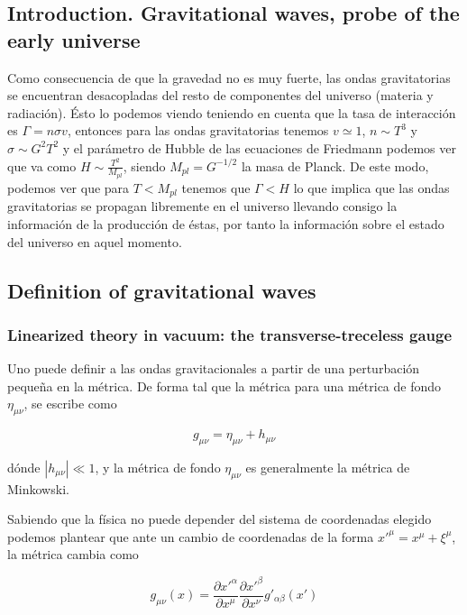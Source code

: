 \subsection{Introduction. Gravitational waves, probe of the early universe}

Como consecuencia de que la gravedad no es muy fuerte, las ondas gravitatorias se encuentran desacopladas del resto de componentes del universo (materia y radiación). Ésto lo podemos viendo teniendo en cuenta que la tasa de interacción es $\Gamma = n \sigma v$, entonces para las ondas gravitatorias tenemos $v \simeq 1$, $n \sim T^3$ y $\sigma \sim G^2 T^2$ y el parámetro de Hubble de las ecuaciones de Friedmann podemos ver que va como $\displaystyle H \sim \frac{T^2}{M_{pl}}$, siendo $M_{pl} = G^{-1/2}$ la masa de Planck. De este modo, podemos ver que para $T < M_{pl}$ tenemos que $\Gamma < H$ lo que implica que las ondas gravitatorias se propagan libremente en el universo llevando consigo la información de la producción de éstas, por tanto la información sobre el estado del universo en aquel momento.

\subsection{Definition of gravitational waves}

\subsubsection{Linearized theory in vacuum: the transverse-treceless gauge}

Uno puede definir a las ondas gravitacionales a partir de una perturbación pequeña en la métrica. De forma tal que la métrica para una métrica de fondo $\eta_{\mu\nu}$, se escribe como

\begin{equation}
    g_{\mu \nu} = \eta_{\mu\nu} + h_{\mu\nu}
\end{equation}

\noindent
dónde $\left| h_{\mu\nu} \right| \ll 1$, y la métrica de fondo $\eta_{\mu\nu}$ es generalmente la métrica de Minkowski.

Sabiendo que la física no puede depender del sistema de coordenadas elegido podemos plantear que ante un cambio de coordenadas de la forma $x'^{\mu} = x^\mu + \xi^\mu$, la métrica cambia como

\begin{equation}
    g_{\mu\nu} (x) = \frac{\partial x'^\alpha}{\partial x^\mu} \frac{\partial x'^\beta}{\partial x^\nu} g'_{\alpha\beta} (x')
\end{equation}

